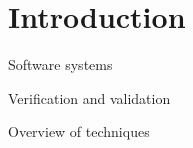 \chapter{Introduction}
\label{cha:introduction}

Software systems \cite{ieee-24765}

Verification and validation

Overview of techniques